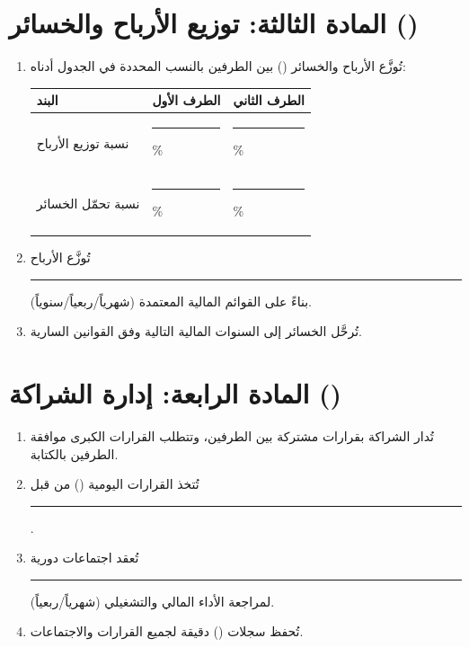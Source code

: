 \documentclass[12pt,a4paper]{article}
\begin{document}
\section{المادة الثالثة: توزيع الأرباح والخسائر ()}
\label{sec:profitloss}
\begin{enumerate}
    \item تُوزَّع الأرباح والخسائر () بين الطرفين بالنسب المحددة في الجدول أدناه:

\begin{table}[H]
\centering
\renewcommand{\arraystretch}{1.5}
\begin{tabularx}{\textwidth}{L{6cm} C{3cm} C{3cm}}
\toprule
\textbf{البند} & \textbf{الطرف الأول} & \textbf{الطرف الثاني} \\
\midrule
نسبة توزيع الأرباح & \rule{2cm}{0.4pt}\% & \rule{2cm}{0.4pt}\% \\
نسبة تحمّل الخسائر & \rule{2cm}{0.4pt}\% & \rule{2cm}{0.4pt}\% \\
\bottomrule
\end{tabularx}
\end{table}

    \item تُوزَّع الأرباح \rule{2cm}{0.4pt} (شهرياً/ربعياً/سنوياً) بناءً على القوائم المالية المعتمدة.
    \item تُرحَّل الخسائر إلى السنوات المالية التالية وفق القوانين السارية.
\end{enumerate}

\section{المادة الرابعة: إدارة الشراكة ()}
\label{sec:management}
\begin{enumerate}
    \item تُدار الشراكة بقرارات مشتركة بين الطرفين، وتتطلب القرارات الكبرى موافقة الطرفين بالكتابة.
    \item تُتخذ القرارات اليومية () من قبل \rule{5cm}{0.4pt}.
    \item تُعقد اجتماعات دورية \rule{2cm}{0.4pt} (شهرياً/ربعياً) لمراجعة الأداء المالي والتشغيلي.
    \item تُحفظ سجلات () دقيقة لجميع القرارات والاجتماعات.
\end{enumerate}
\end{document}
